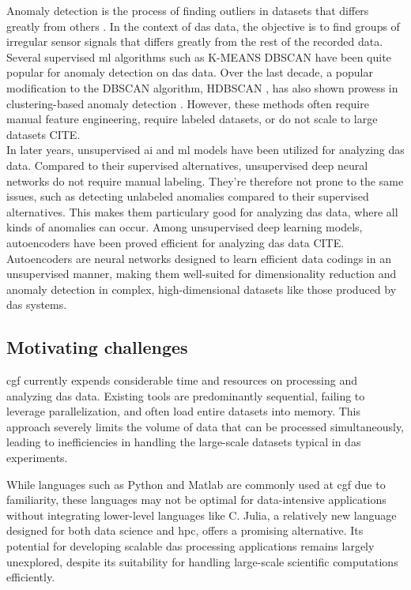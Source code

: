 Anomaly detection is the process of finding outliers in datasets that differs greatly from others \cite{anomaly}. In the context of \acrshort{das} data, the objective is to find groups of irregular sensor signals that differs greatly from the rest of the recorded data. 
Several supervised \acrfull{ml} algorithms such as K-MEANS \cite{hartigan1979k} DBSCAN \cite{ester1996density} have been quite popular for anomaly detection on \acrshort{das} data. Over the last decade, a popular modification to the DBSCAN algorithm, HDBSCAN \cite{rahman2016hdbscandensitybasedclustering}, has also shown prowess in clustering-based anomaly detection \cite{ariyaluran2022clustering}. However, these methods often require manual feature engineering, require labeled datasets, or do not scale to large datasets CITE.  \\
In later years, unsupervised \acrshort{ai} and \acrshort{ml} models have been utilized for analyzing \acrshort{das} data. Compared to their supervised alternatives, unsupervised deep neural networks do not require manual labeling. They're therefore not prone to the same issues, such as detecting unlabeled anomalies \cite{wei2022lstmautoencoder, srivastava2016unsupervised} compared to their supervised alternatives. This makes them particulary good for analyzing \acrshort{das} data, where all kinds of anomalies can occur. 
Among unsupervised deep learning models, autoencoders have been proved efficient for analyzing \acrshort{das} data CITE. Autoencoders are neural networks designed to learn efficient data codings in an unsupervised manner, making them well-suited for dimensionality reduction and anomaly detection in complex, high-dimensional datasets like those produced by \acrshort{das} systems.

\subsection{Motivating challenges}

\acrshort{cgf} currently expends considerable time and resources on processing and analyzing \acrshort{das} data. Existing tools are predominantly sequential, failing to leverage parallelization, and often load entire datasets into memory. This approach severely limits the volume of data that can be processed simultaneously, leading to inefficiencies in handling the large-scale datasets typical in \acrshort{das} experiments. 

While languages such as Python and Matlab are commonly used at \acrshort{cgf} due to familiarity, these languages may not be optimal for data-intensive applications without integrating lower-level languages like C. Julia, a relatively new language designed for both data science and \acrfull{hpc}, offers a promising alternative. Its potential for developing scalable \acrshort{das} processing applications remains largely unexplored, despite its suitability for handling large-scale scientific computations efficiently. 

